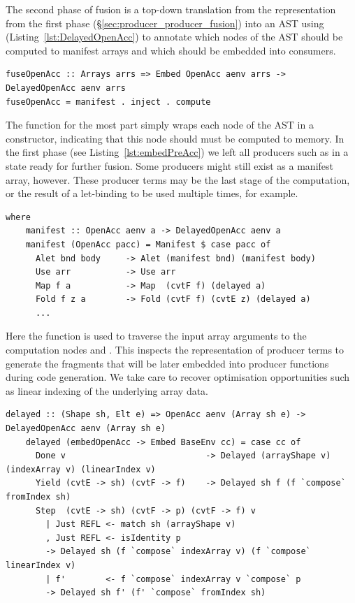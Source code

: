 The second phase of fusion is a top-down translation from the 
representation from the first phase (\S\ref{sec:producer_producer_fusion}) into
an AST using  (Listing~\ref{lst:DelayedOpenAcc}) to
annotate which nodes of the AST should be computed to manifest arrays and which
should be embedded into consumers.

\begin{lstlisting}[style=haskell
    ,name=fuseOpenAcc
    ,label=lst:fuseOpenAcc
    ,caption={[Consumer fusion via top-down knot-tying of the AST]}]
fuseOpenAcc :: Arrays arrs => Embed OpenAcc aenv arrs -> DelayedOpenAcc aenv arrs
fuseOpenAcc = manifest . inject . compute
\end{lstlisting}

The function  for the most part simply wraps each node of the
AST in a  constructor, indicating
that this node should must be computed to memory. In the first phase (see
Listing~\ref{lst:embedPreAcc}) we left all producers such as  in a
state ready for further fusion. Some producers might still exist as a manifest
array, however. These producer terms may be the last stage of the computation,
or the result of a let-binding to be used multiple times, for example.

\begin{lstlisting}[style=haskell,name=fuseOpenAcc]
  where
    manifest :: OpenAcc aenv a -> DelayedOpenAcc aenv a
    manifest (OpenAcc pacc) = Manifest $ case pacc of
      Alet bnd body     -> Alet (manifest bnd) (manifest body)
      Use arr           -> Use arr
      Map f a           -> Map  (cvtF f) (delayed a)
      Fold f z a        -> Fold (cvtF f) (cvtE z) (delayed a)
      ...
\end{lstlisting}

Here the function  is used to traverse the input array arguments
to the computation nodes  and . This inspects the
 representation of producer terms to generate the fragments that
will be later embedded into producer functions during code generation. We take
care to recover optimisation opportunities such as linear indexing of the
underlying array data.

\begin{lstlisting}[style=haskell,name=fuseOpenAcc]
    delayed :: (Shape sh, Elt e) => OpenAcc aenv (Array sh e) -> DelayedOpenAcc aenv (Array sh e)
    delayed (embedOpenAcc -> Embed BaseEnv cc) = case cc of
      Done v                            -> Delayed (arrayShape v) (indexArray v) (linearIndex v)
      Yield (cvtE -> sh) (cvtF -> f)    -> Delayed sh f (f `compose` fromIndex sh)
      Step  (cvtE -> sh) (cvtF -> p) (cvtF -> f) v
        | Just REFL <- match sh (arrayShape v)
        , Just REFL <- isIdentity p
        -> Delayed sh (f `compose` indexArray v) (f `compose` linearIndex v)
        | f'        <- f `compose` indexArray v `compose` p
        -> Delayed sh f' (f' `compose` fromIndex sh)
\end{lstlisting}


